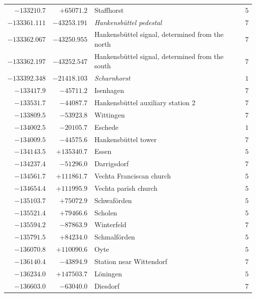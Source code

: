\begin{center}
\begin{tabular}{r|r|p{170pt}|r}
\(-133210.7\)&\(+65071.2\)&Staffhorst&\(5\)\\
\(-133361.111\)&\(-43253.191\)&\textit{Hankensbüttel pedestal}&\(7\)\\
\(-133362.067\)&\(-43250.955\)&Hankensbüttel signal, determined from the north&\(7\)\\
\(-133362.197\)&\(-43252.547\)&Hankensbüttel signal, determined from the south&\(7\)\\
\(-133392.348\)&\(-21418.103\)&\textit{Scharnhorst}&\(1\)\\
\(-133417.9\)&\(-45711.2\)&Isenhagen&\(7\)\\
\(-133531.7\)&\(-44087.7\)&Hankensbüttel auxiliary station 2&\(7\)\\
\(-133809.5\)&\(-53923.8\)&Wittingen&\(7\)\\
\(-134002.5\)&\(-20105.7\)&Eschede&\(1\)\\
\(-134009.5\)&\(-44575.6\)&Hankensbüttel tower&\(7\)\\
\(-134143.5\)&\(+135340.7\)&Essen&\(5\)\\
\(-134237.4\)&\(-51296.0\)&Darrigsdorf&\(7\)\\
\(-134561.7\)&\(+111861.7\)&Vechta Franciscan church&\(5\)\\
\(-134654.4\)&\(+111995.9\)&Vechta parish church&\(5\)\\
\(-135103.7\)&\(+75072.9\)&Schwaförden&\(5\)\\
\(-135521.4\)&\(+79466.6\)&Scholen&\(5\)\\
\(-135594.2\)&\(-87863.9\)&Winterfeld&\(7\)\\
\(-135791.5\)&\(+84234.0\)&Schmalförden&\(5\)\\
\(-136070.8\)&\(+110090.6\)&Oyte&\(5\)\\
\(-136140.4\)&\(-43894.9\)&Station near Wittendorf&\(7\)\\
\(-136234.0\)&\(+147503.7\)&Löningen&\(5\)\\
\(-136603.0\)&\(-63040.0\)&Diesdorf&\(7\)\\
\hline\end{tabular}\endgroup\end{center}
\clearpage
